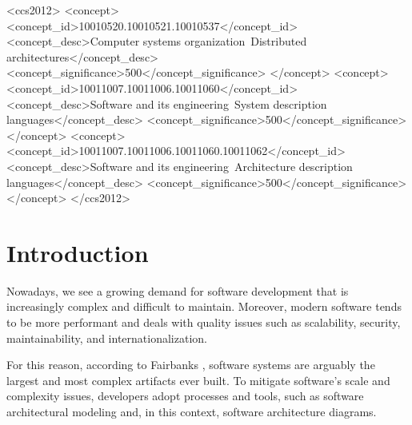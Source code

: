 \documentclass[sigconf]{acmart}
\begin{document}
\begin{CCSXML}
<ccs2012>
   <concept>
       <concept_id>10010520.10010521.10010537</concept_id>
       <concept_desc>Computer systems organization~Distributed architectures</concept_desc>
       <concept_significance>500</concept_significance>
       </concept>
   <concept>
       <concept_id>10011007.10011006.10011060</concept_id>
       <concept_desc>Software and its engineering~System description languages</concept_desc>
       <concept_significance>500</concept_significance>
       </concept>
   <concept>
       <concept_id>10011007.10011006.10011060.10011062</concept_id>
       <concept_desc>Software and its engineering~Architecture description languages</concept_desc>
       <concept_significance>500</concept_significance>
       </concept>
 </ccs2012>
\end{CCSXML}




\maketitle

\section{Introduction}
Nowadays, we see a growing demand for software development that is increasingly complex and difficult to maintain. Moreover, modern software tends to be more performant and deals with quality issues such as scalability, security, maintainability, and internationalization.

For this reason, according to Fairbanks  \cite{fairbanks2010}, software systems are arguably the largest and most complex artifacts ever built. To mitigate software's scale and complexity issues, developers adopt processes and tools, such as software architectural modeling and, in this context, software architecture diagrams.
\end{document}
